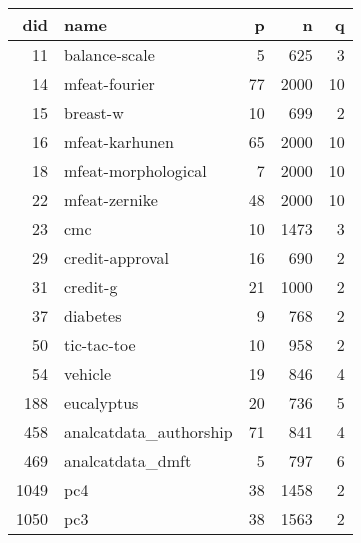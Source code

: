 \begin{tabular}{rlrrr}
\toprule
  did &                             name &  p &  n &  q \\
\midrule
   11 &                    balance-scale &                 5 &                625 &                3 \\
   14 &                    mfeat-fourier &                77 &               2000 &               10 \\
   15 &                         breast-w &                10 &                699 &                2 \\
   16 &                   mfeat-karhunen &                65 &               2000 &               10 \\
   18 &              mfeat-morphological &                 7 &               2000 &               10 \\
   22 &                    mfeat-zernike &                48 &               2000 &               10 \\
   23 &                              cmc &                10 &               1473 &                3 \\
   29 &                  credit-approval &                16 &                690 &                2 \\
   31 &                         credit-g &                21 &               1000 &                2 \\
   37 &                         diabetes &                 9 &                768 &                2 \\
   50 &                      tic-tac-toe &                10 &                958 &                2 \\
   54 &                          vehicle &                19 &                846 &                4 \\
  188 &                       eucalyptus &                20 &                736 &                5 \\
  458 &           analcatdata\_authorship &                71 &                841 &                4 \\
  469 &                 analcatdata\_dmft &                 5 &                797 &                6 \\
 1049 &                              pc4 &                38 &               1458 &                2 \\
 1050 &                              pc3 &                38 &               1563 &                2 \\

\end{tabular}
